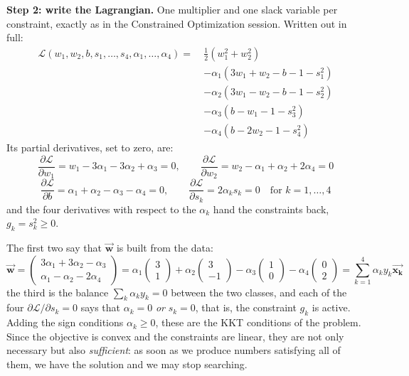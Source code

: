\documentclass[]{article}
\newcommand{\vecxk}{ \vec{\mathbf{x_k}} }
\newcommand{\vecw}{ \vec{\mathbf{w}} }
\begin{document}
	\noindent \textbf{Step 2: write the Lagrangian.}
	One multiplier and one slack variable per constraint, exactly as in the Constrained Optimization session.
	Written out in full:
	$$
	\begin{aligned}
		\mathcal{L}\left(w_1, w_2, b, s_1, \dots, s_4, \alpha_1, \dots, \alpha_4\right)
		= \ & \frac{1}{2} \left( w_1^2 + w_2^2 \right) \\
		& - \alpha_1 \left( 3 w_1 + w_2 - b - 1 - s_1^2 \right) \\
		& - \alpha_2 \left( 3 w_1 - w_2 - b - 1 - s_2^2 \right) \\
		& - \alpha_3 \left( b - w_1 - 1 - s_3^2 \right) \\
		& - \alpha_4 \left( b - 2 w_2 - 1 - s_4^2 \right)
	\end{aligned}
	$$
	Its partial derivatives, set to zero, are:
	$$
	\frac{\partial \mathcal{L}}{\partial w_1} = w_1 - 3\alpha_1 - 3\alpha_2 + \alpha_3 = 0,
	\qquad
	\frac{\partial \mathcal{L}}{\partial w_2} = w_2 - \alpha_1 + \alpha_2 + 2\alpha_4 = 0
	$$
	$$
	\frac{\partial \mathcal{L}}{\partial b} = \alpha_1 + \alpha_2 - \alpha_3 - \alpha_4 = 0,
	\qquad
	\frac{\partial \mathcal{L}}{\partial s_k} = 2 \alpha_k s_k = 0
	\quad \text{for } k = 1, \dots, 4
	$$
	and the four derivatives with respect to the $\alpha_k$ hand the constraints back, $g_k = s_k^2 \geq 0$.

	The first two say that $\vecw$ is built from the data:
	$$
	\vecw = \begin{pmatrix} 3\alpha_1 + 3\alpha_2 - \alpha_3 \\ \alpha_1 - \alpha_2 - 2\alpha_4 \end{pmatrix}
	= \alpha_1 \begin{pmatrix} 3 \\ 1 \end{pmatrix}
	+ \alpha_2 \begin{pmatrix} 3 \\ -1 \end{pmatrix}
	- \alpha_3 \begin{pmatrix} 1 \\ 0 \end{pmatrix}
	- \alpha_4 \begin{pmatrix} 0 \\ 2 \end{pmatrix}
	= \sum_{k=1}^{4} \alpha_k y_k \vecxk
	$$
	the third is the balance $\sum_k \alpha_k y_k = 0$ between the two classes, and each of the four $\partial \mathcal{L} / \partial s_k = 0$ says that $\alpha_k = 0$ \textit{or} $s_k = 0$, that is, the constraint $g_k$ is active.
	Adding the sign conditions $\alpha_k \geq 0$, these are the KKT conditions of the problem.
	Since the objective is convex and the constraints are linear, they are not only necessary but also \textit{sufficient}: as soon as we produce numbers satisfying all of them, we have the solution and we may stop searching.
\end{document}
